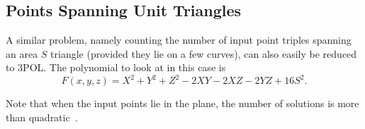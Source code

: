 \subsection{Points Spanning Unit Triangles}%
\label{sec:paper:3pol-algorithm:application:triangles}

A similar problem, namely counting the number of input point triples spanning
an area $S$ triangle (provided they lie on a few curves), can also easily be
reduced to 3POL\@.
%
The polynomial to look at in this case is
\begin{displaymath}
	F(x,y,z) = X^2 + Y^2 + Z^2 - 2XY - 2XZ - 2YZ + 16 S^2.
\end{displaymath}

Note that when the input points lie in the plane, the number of solutions is
more than quadratic~\cite{RS15,RSS15b}.
